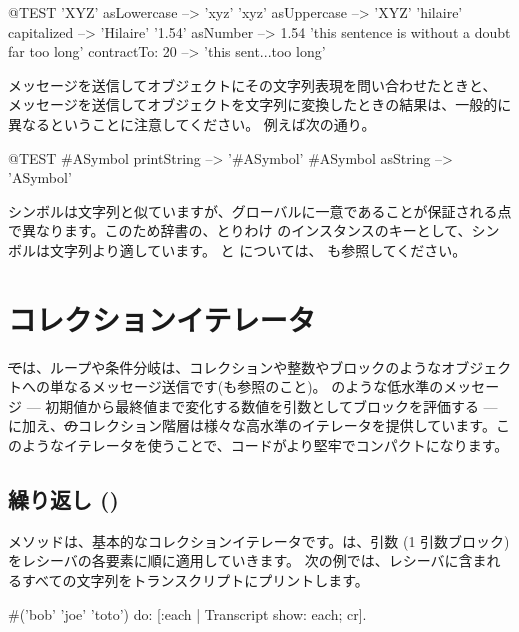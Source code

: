 \documentclass[a4paper,10pt,twoside]{book}
\begin{document}
\begin{code}{@TEST}
'XYZ' asLowercase --> 'xyz'
'xyz' asUppercase   --> 'XYZ'
'hilaire' capitalized   --> 'Hilaire'
'1.54' asNumber      --> 1.54
'this sentence is without a doubt far too long' contractTo: 20 --> 'this sent...too long'
\end{code}

 メッセージを送信してオブジェクトにその文字列表現を問い合わせたときと、 メッセージを送信してオブジェクトを文字列に変換したときの結果は、一般的に異なるということに注意してください。
例えば次の通り。

\begin{code}{@TEST}
#ASymbol printString --> '#ASymbol'
#ASymbol asString    --> 'ASymbol'
\end{code}

シンボルは文字列と似ていますが、グローバルに一意であることが保証される点で異なります。このため辞書の、とりわけ  のインスタンスのキーとして、シンボルは文字列より適しています。
 と  については、 も参照してください。

\section{コレクションイテレータ}

\st では、ループや条件分岐は、コレクションや整数やブロックのようなオブジェクトへの単なるメッセージ送信です(も参照のこと)。 のような低水準のメッセージ --- 初期値から最終値まで変化する数値を引数としてブロックを評価する --- に加え、\st のコレクション階層は様々な高水準のイテレータを提供しています。このようなイテレータを使うことで、コードがより堅牢でコンパクトになります。

\subsection{繰り返し ()}
 メソッドは、基本的なコレクションイテレータです。は、引数 (1 引数ブロック)をレシーバの各要素に順に適用していきます。
次の例では、レシーバに含まれるすべての文字列をトランスクリプトにプリントします。

\begin{code}{}
#('bob' 'joe' 'toto') do: [:each | Transcript show: each; cr].
\end{code}
\end{document}
